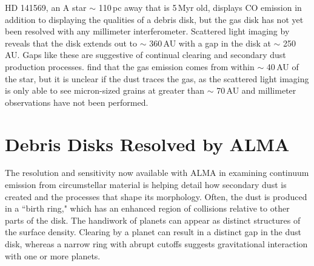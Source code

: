 HD 141569, an A star $\sim$ 110\,pc away that is 5\,Myr old, displays CO emission in addition to displaying the qualities of a debris disk, but the gas disk has not yet been resolved with any millimeter interferometer. Scattered light imaging by \cite{Wein00} reveals that the disk extends out to $\sim$ 360\,AU with a gap in the disk at $\sim$ 250\,AU. Gaps like these are suggestive of continual clearing and secondary dust production processes. \cite{Brit07} find that the gas emission comes from within $\sim$ 40\,AU of the star, but it is unclear if the dust traces the gas, as the scattered light imaging is only able to see micron-sized grains at greater than $\sim$ 70\,AU and millimeter observations have not been performed. 


\section{Debris Disks Resolved by ALMA}

The resolution and sensitivity now available with ALMA in examining continuum emission from circumstellar material is helping detail how secondary dust is created and the processes that shape its morphology. Often, the dust is produced in a ``birth ring," which has an enhanced region of collisions relative to other parts of the disk. The handiwork of planets can appear as distinct structures of the surface density. Clearing by a planet can result in a distinct gap in the dust disk, whereas a narrow ring with abrupt cutoffs suggests gravitational interaction with one or more planets.


